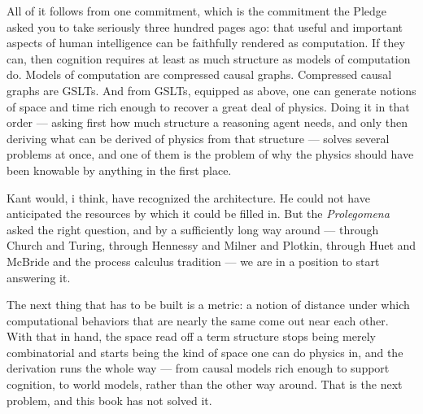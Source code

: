 All of it follows from one commitment, which is the commitment the
Pledge asked you to take seriously three hundred pages ago: that
useful and important aspects of human intelligence can be
faithfully rendered as computation.
If they can, then cognition requires at least as much structure as
models of computation do.
Models of computation are compressed causal graphs.
Compressed causal graphs are GSLTs.
And from GSLTs, equipped as above, one can generate notions of
space and time rich enough to recover a great deal of physics.
Doing it in that order --- asking first how much structure a
reasoning agent needs, and only then deriving what can be derived
of physics from that structure --- solves several problems at once,
and one of them is the problem of why the physics should have been
knowable by anything in the first place.

Kant would, i think, have recognized the architecture.
He could not have anticipated the resources by which it could be
filled in.
But the \emph{Prolegomena} asked the right question, and by a
sufficiently long way around --- through Church and Turing, through
Hennessy and Milner and Plotkin, through Huet and McBride and the
process calculus tradition --- we are in a position to start
answering it.

The next thing that has to be built is a metric: a notion of
distance under which computational behaviors that are nearly the
same come out near each other.
With that in hand, the space read off a term structure stops being
merely combinatorial and starts being the kind of space one can do
physics in, and the derivation runs the whole way --- from causal
models rich enough to support cognition, to world models, rather
than the other way around.
That is the next problem, and this book has not solved it.
